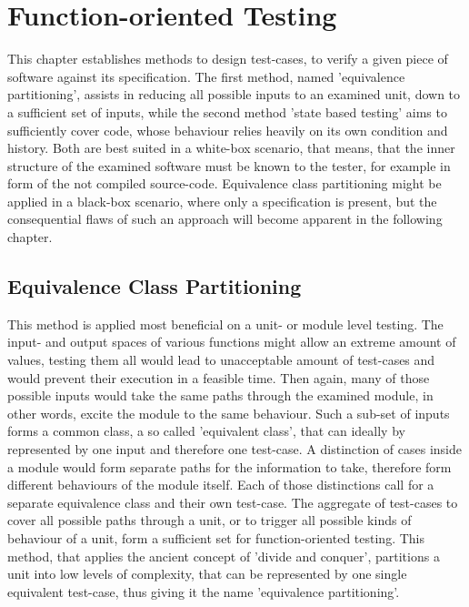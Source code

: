 		
	

	\section{Function-oriented Testing}

	This chapter establishes methods to design test-cases, to verify a given piece of software against its specification. The first method, named 'equivalence partitioning', assists in reducing all possible inputs to an examined unit, down to a sufficient set of inputs, while the second method 'state based testing' aims to sufficiently cover code, whose behaviour relies heavily on its own condition and history. Both are best suited in a white-box scenario, that means, that the inner structure of the examined software must be known to the tester, for example in form of the not compiled source-code. Equivalence class partitioning might be applied in a black-box scenario, where only a specification is present, but the consequential flaws of such an approach will become apparent in the following chapter.

	\subsection{Equivalence Class Partitioning}
	This method is applied most beneficial on a unit- or module level testing. The input- and output spaces of various functions might allow an extreme amount of values, testing them all would lead to unacceptable amount of test-cases and would prevent their execution in a feasible time. Then again, many of those possible inputs would take the same paths through the examined module, in other words, excite the module to the same behaviour. Such a sub-set of inputs forms a common class, a so called 'equivalent class', that can ideally by represented by one input and therefore one test-case. A distinction of cases inside a module would form separate paths for the information to take, therefore form different behaviours of the module itself. Each of those distinctions call for a separate equivalence class and their own test-case. The aggregate of test-cases to cover all possible paths through a unit, or to trigger all possible kinds of behaviour of a unit, form a sufficient set for function-oriented testing. This method, that applies the ancient concept of 'divide and conquer', partitions a unit into low levels of complexity, that can be represented by one single equivalent test-case, thus giving it the name 'equivalence partitioning'.

